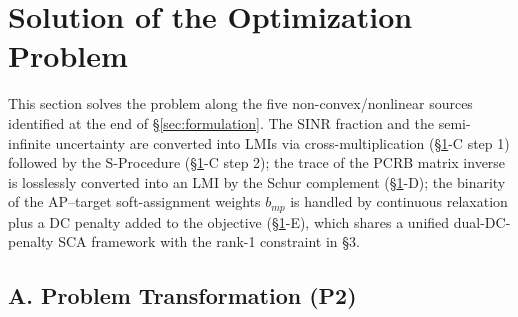 \section{Solution of the Optimization Problem}\label{sec:relaxation}

This section solves the problem along the five non-convex/nonlinear sources identified at the end of \S\ref{sec:formulation}. The SINR fraction and the semi-infinite uncertainty are converted into LMIs via cross-multiplication (\S\ref{sec:relaxation}-C step 1) followed by the S-Procedure (\S\ref{sec:relaxation}-C step 2); the trace of the PCRB matrix inverse is losslessly converted into an LMI by the Schur complement (\S\ref{sec:relaxation}-D); the binarity of the AP--target soft-assignment weights $b_{mp}$ is handled by continuous relaxation plus a DC penalty added to the objective (\S\ref{sec:relaxation}-E), which shares a unified dual-DC-penalty SCA framework with the rank-1 constraint in \S3.

\subsection*{A. Problem Transformation (P2)}

